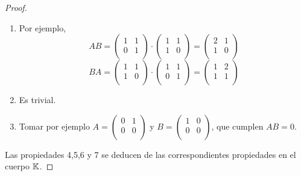 \begin{proof}
	\begin{enumerate}
		\item Por ejemplo,
		      \[
			      AB = \begin{pmatrix}
				      1 & 1 \\
				      0 & 1 \\
			      \end{pmatrix} \cdot \begin{pmatrix}
				      1 & 1 \\
				      1 & 0 \\
			      \end{pmatrix} = \begin{pmatrix}
				      2 & 1 \\
				      1 & 0 \\
			      \end{pmatrix}
		      \]
		      \[
			      BA = \begin{pmatrix}
				      1 & 1 \\
				      1 & 0 \\
			      \end{pmatrix} \cdot \begin{pmatrix}
				      1 & 1 \\
				      0 & 1 \\
			      \end{pmatrix} = \begin{pmatrix}
				      1 & 2 \\
				      1 & 1 \\
			      \end{pmatrix}
		      \]
		\item Es trivial.
		\item Tomar por ejemplo \(A = \begin{pmatrix}
			      0 & 1 \\
			      0 & 0 \\
		      \end{pmatrix}\) y \(B = \begin{pmatrix}
			      1 & 0 \\
			      0 & 0 \\
		      \end{pmatrix}\), que cumplen \(AB = 0\).

	\end{enumerate}
	Las propiedades 4,5,6 y 7 se deducen de las correspondientes propiedades en el cuerpo \(\mathbb{K}  \).
\end{proof}

